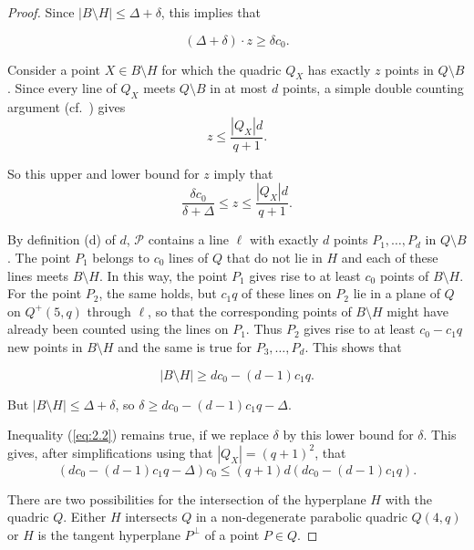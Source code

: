 \documentclass[a4paper]{article}
\theoremstyle{definition}
\begin{document}
\begin{proof}
Since $|B \setminus H | \leq \Delta+\delta$, this implies that

\begin{equation}
(\Delta+\delta)\cdot z \geq \delta c_0.
\end{equation}

Consider a point $X \in B \setminus H$ for which the quadric $Q_X$ has exactly $z$ points in $Q \setminus  B$. Since
every line of $Q_X$ meets $Q \setminus B$ in at most $d$ points, a simple double counting argument (cf.\ \cite[Lemma~2.1]{metsch2000blocking}) gives
\[z \leq \frac{|Q_X|d}{q+1}.\]

So this   upper and lower bound for $z$ imply that
\begin{equation}\label{eq:2.2}
\frac{\delta c_0}{\delta+\Delta} \leq z \leq \frac{|Q_X|d}{q+1}.
\end{equation}


By definition (d) of $d$, ${\mathcal P}$ contains a line $\ell$ with exactly $d$ points $P_1,\dots,  P_d$ in $Q \setminus B$. The point $P_1$
belongs to $c_0$ lines of $Q$ that do not lie in $H$ and each of these lines meets $B \setminus  H$. In this way, the
point $P_1$ gives rise to at least $c_0$ points of $B\setminus H$. For the point $P_2$, the same holds, but $c_1q$ of these
lines on $P_2$ lie in a plane of $Q$ on $Q^+(5,q)$ through $\ell$, so that the corresponding points of $B \setminus H$ might have 
already been counted using the lines on $P_1$. Thus $P_2$ gives rise to at least $c_0 - c_1q$ new points in
$B \setminus  H$ and the same is true for $P_3,\dots, P_d$.  This shows that

\begin{equation}\label{eq:2.3}
|B \setminus  H| \geq dc_0 - (d - 1)c_1 q.
\end{equation}

 But $|B \setminus  H| \leq  \Delta + \delta$, so
$\delta \geq  dc_0 - (d - 1)c_1q - \Delta$.

Inequality (\ref{eq:2.2}) remains true, if we replace $\delta$ by this lower bound for $\delta$. This gives, after
simplifications using that $|Q_X|=(q+1)^2$, that
\begin{equation}\label{eq:2.4}
(dc_0- (d - 1)c_1q-\Delta) c_0\leq  (q + 1)  d(dc_0-(d-1)c_1q).
\end{equation}

There are two possibilities for the intersection of the hyperplane $H$ with the quadric $Q$.
Either $H$ intersects $Q$ in a non-degenerate parabolic quadric $Q(4,q)$ or $H$ is the tangent hyperplane $P^\perp$ of a point $P \in Q$.
    

\end{proof}
\end{document}
